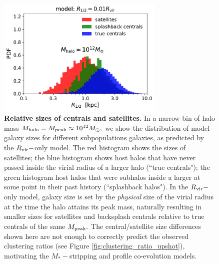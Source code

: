 \documentclass[usenatbib,usegraphicx,letterpaper]{mn2e}
\newcommand{\mstar}{M_{\ast}}
\newcommand{\mpeak}{M_{\rm peak}}
\newcommand{\mhalo}{M_{\rm halo}}
\newcommand{\rvir}{R_{\rm vir}}
\newcommand{\msun}{M_\odot}
\begin{document}
\begin{figure}
\centering
\includegraphics[width=8cm]{FIGS/rvir_only_cen_sat_sizes.pdf}
\caption{
{\bf Relative sizes of centrals and satellites.} 
In a narrow bin of halo mass $\mhalo=\mpeak\approx10^{12}\msun,$ we show the distribution of model galaxy sizes for different subpopulations galaxies, as predicted by the $\rvir-$only model. The red histogram shows the sizes of satellites; the blue histogram shows host halos that have never passed inside the virial radius of a larger halo (``true centrals"); the green histogram host halos that were subhalos inside a larger at some point in their past history (``splashback halos"). In the $\rvir-$only model, galaxy size is set by the {\em physical} size of the virial radius at the time the halo attains its peak mass, naturally resulting in smaller sizes for satellites and backsplash centrals relative to true centrals of the same $\mpeak.$ The central/satellite size differences shown here are not enough to correctly predict the observed clustering ratios (see Figure \ref{fig:clustering_ratio_upshot}), motivating the $\mstar-$stripping and profile co-evolution models.
}
\label{fig:censatsizehist}
\end{figure}
\end{document}
